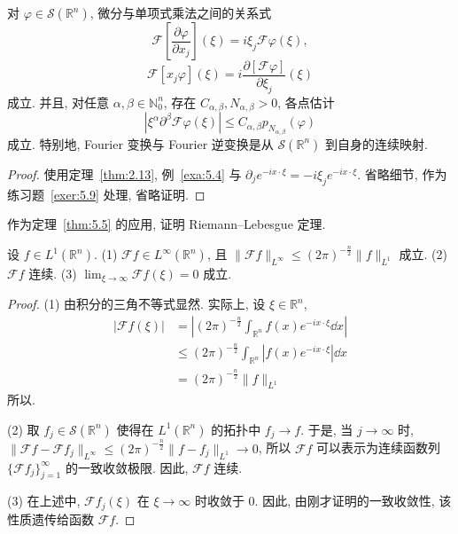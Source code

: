 \begin{theorem}\label{thm:5.5}
对 $\varphi \in \mathcal{S}(\mathbb{R}^{n})$, 微分与单项式乘法之间的关系式
\begin{equation}\tag{5.7}
\mathcal{F}\left[\frac{\partial\varphi}{\partial x_{j}}\right](\xi) = i\xi_{j}\mathcal{F}\varphi(\xi),
\label{eq:5.7}
\end{equation}
\begin{equation}\tag{5.8}
\mathcal{F}[x_{j}\varphi](\xi) = i\frac{\partial[\mathcal{F}\varphi]}{\partial\xi_{j}}(\xi)
\label{eq:5.8}
\end{equation}
成立. 并且, 对任意 $\alpha, \beta \in \mathbb{N}_{0}^{n}$, 存在 $C_{\alpha,\beta}, N_{\alpha,\beta} > 0$, 各点估计
\begin{equation}\tag{5.9}
|\xi^{\alpha}\partial^{\beta}\mathcal{F}\varphi(\xi)| \leq C_{\alpha,\beta}p_{N_{\alpha,\beta}}(\varphi)
\label{eq:5.9}
\end{equation}
成立. 特别地, Fourier 变换与 Fourier 逆变换是从 $\mathcal{S}(\mathbb{R}^{n})$ 到自身的连续映射.
\end{theorem}

\begin{proof}
使用定理~\ref{thm:2.13}, 例~\ref{exa:5.4} 与 $\partial_{j}e^{-ix \cdot \xi} = -i\xi_{j}e^{-ix \cdot \xi}$. 省略细节, 作为练习题~\ref{exer:5.9} 处理, 省略证明.
\end{proof}

作为定理~\ref{thm:5.5} 的应用, 证明 Riemann--Lebesgue 定理.

\begin{theorem}\label{thm:5.6}
设 $f \in L^{1}(\mathbb{R}^{n})$.
(1) $\mathcal{F}f \in L^{\infty}(\mathbb{R}^{n})$, 且 $\|\mathcal{F}f\|_{L^{\infty}} \leq (2\pi)^{-\frac{n}{2}}\|f\|_{L^{1}}$ 成立.
(2) $\mathcal{F}f$ 连续.
(3) $\lim_{\xi \to \infty}\mathcal{F}f(\xi) = 0$ 成立.
\end{theorem}

\begin{proof}
(1) 由积分的三角不等式显然. 实际上, 设 $\xi \in \mathbb{R}^{n}$,
\begin{align*}
|\mathcal{F}f(\xi)| &= \left|(2\pi)^{-\frac{n}{2}}\int_{\mathbb{R}^{n}}f(x)e^{-ix \cdot \xi}\dd x\right| \\
&\leq (2\pi)^{-\frac{n}{2}}\int_{\mathbb{R}^{n}}|f(x)e^{-ix \cdot \xi}|\dd x \\
&= (2\pi)^{-\frac{n}{2}}\|f\|_{L^{1}}
\end{align*}
所以.

(2) 取 $f_{j} \in \mathcal{S}(\mathbb{R}^{n})$ 使得在 $L^{1}(\mathbb{R}^{n})$ 的拓扑中 $f_{j} \to f$. 于是, 当 $j \to \infty$ 时, $\|\mathcal{F}f - \mathcal{F}f_{j}\|_{L^{\infty}} \leq (2\pi)^{-\frac{n}{2}}\|f - f_{j}\|_{L^{1}} \to 0$, 所以 $\mathcal{F}f$ 可以表示为连续函数列 $\{\mathcal{F}f_{j}\}_{j=1}^{\infty}$ 的一致收敛极限. 因此, $\mathcal{F}f$ 连续.

(3) 在上述中, $\mathcal{F}f_{j}(\xi)$ 在 $\xi \to \infty$ 时收敛于 0. 因此, 由刚才证明的一致收敛性, 该性质遗传给函数 $\mathcal{F}f$.
\end{proof}

